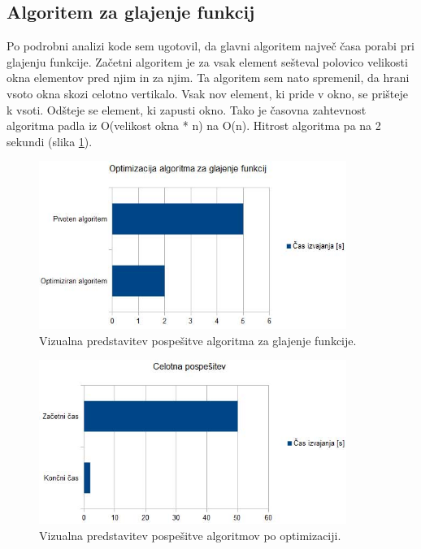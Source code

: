 \documentclass[oneside, a4paper, 12pt]{book}
\begin{document}
\subsection{Algoritem za glajenje funkcij}
Po podrobni analizi kode sem ugotovil, da glavni algoritem največ časa porabi pri glajenju funkcije. Začetni algoritem je za vsak element sešteval polovico velikosti okna elementov pred njim in za njim. Ta algoritem sem nato spremenil, da hrani vsoto okna skozi celotno vertikalo. Vsak nov element, ki pride v okno, se prišteje k vsoti. Odšteje se element, ki zapusti okno. Tako je časovna zahtevnost algoritma padla iz O(velikost okna * n) na O(n). Hitrost algoritma pa na 2 sekundi (slika \ref{pic:opt-g}).


\begin{figure}
\begin{center}
\includegraphics[width=10cm]{slike/optimizacija_grafi/optimizacija-algoritma-za-glajenje-funkcij.jpg}
\end{center}
\caption{Vizualna predstavitev pospešitve algoritma za glajenje funkcije.}
\label{pic:opt-g}
\end{figure}

\begin{figure}
\begin{center}
\includegraphics[width=10cm]{slike/optimizacija_grafi/celotna-pospesitev.jpg}
\end{center}
\caption{Vizualna predstavitev pospešitve algoritmov po optimizaciji.}
\label{pic:opt-c}
\end{figure}
\end{document}
